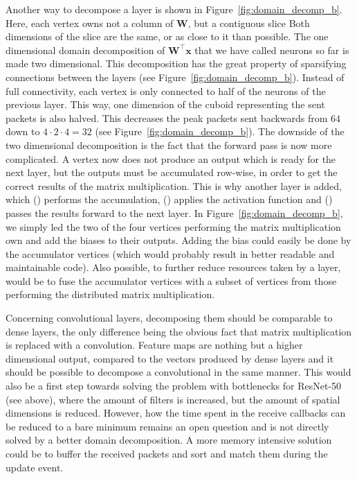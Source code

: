 \documentclass[]{article}
\begin{document}
Another way to decompose a layer is shown in
Figure~\ref{fig:domain_decomp_b}.
Here, each vertex owns not a column of $\mathbf{W}$, but a contiguous
slice
Both dimensions of the slice are the same, or as close to it than
possible.
The one dimensional domain decomposition of
$\mathbf{W}^\top\mathbf{x}$ that we have called neurons so far is
made two dimensional.
This decomposition has the great property of sparsifying connections
between the layers (see Figure~\ref{fig:domain_decomp_b}).
Instead of full connectivity, each vertex is only connected to half
of the neurons of the previous layer.
This way, one dimension of the cuboid representing the sent packets
is also halved.
This decreases the peak packets sent backwards from $64$ down to
$4 \cdot 2 \cdot 4 = 32$ (see Figure~\ref{fig:domain_decomp_b}).
The downside of the two dimensional decomposition is the fact that
the forward pass is now more complicated.
A vertex now does not produce an output which is ready for the next
layer, but the outputs must be accumulated row-wise, in order to
get the correct results of the matrix multiplication.
This is why another layer is added, which () performs
the accumulation, () applies the activation function
and () passes the results forward to the next layer.
In Figure~\ref{fig:domain_decomp_b}, we simply led the two of the
four vertices performing the matrix multiplication own and add the
biases to their outputs.
Adding the bias could easily be done by the accumulator vertices
(which would probably result in better readable and maintainable
code).
Also possible, to further reduce resources taken by a layer, would be
to fuse the accumulator vertices with a subset of vertices from those
performing the distributed matrix multiplication.

Concerning convolutional layers, decomposing them should be comparable
to dense layers, the only difference being the obvious fact that
matrix multiplication is replaced with a convolution.
Feature maps are nothing but a higher dimensional output, compared
to the vectors produced by dense layers and it should be possible to
decompose a convolutional in the same manner.
This would also be a first step towards solving the problem with
bottlenecks for ResNet-50 (see above), where the amount of filters
is increased, but the amount of spatial dimensions is reduced.
However, how the time spent in the receive callbacks can be reduced
to a bare minimum remains an open question and is not directly solved
by a better domain decomposition.
A more memory intensive solution could be to buffer the received
packets and sort and match them during the update event.
\end{document}
